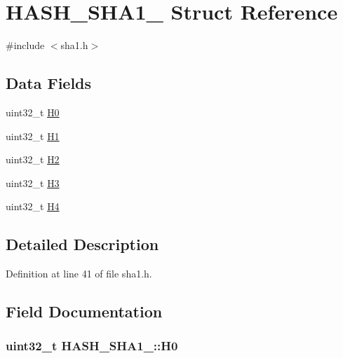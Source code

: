 \hypertarget{structHASH__SHA1__}{\section{H\-A\-S\-H\-\_\-\-S\-H\-A1\-\_\- Struct Reference}
\label{structHASH__SHA1__}
}


{\ttfamily \#include $<$sha1.\-h$>$}

\subsection*{Data Fields}
\begin{DoxyCompactItemize}
\item 
uint32\-\_\-t \hyperlink{structHASH__SHA1___ae1189b75309d542cc08e0eb954fb38af}{H0}
\item 
uint32\-\_\-t \hyperlink{structHASH__SHA1___a2545254302e2eb1e28e94f43cee5ac98}{H1}
\item 
uint32\-\_\-t \hyperlink{structHASH__SHA1___a889fdb5090b3b3d0a823f4f951e32b6c}{H2}
\item 
uint32\-\_\-t \hyperlink{structHASH__SHA1___a453afc35ccc047109080a44ba41d1a66}{H3}
\item 
uint32\-\_\-t \hyperlink{structHASH__SHA1___ab66c6842b1d406e053a31f1370eefb25}{H4}
\end{DoxyCompactItemize}


\subsection{Detailed Description}


Definition at line 41 of file sha1.\-h.



\subsection{Field Documentation}
\hypertarget{structHASH__SHA1___ae1189b75309d542cc08e0eb954fb38af}{
\subsubsection[{H0}]{\setlength{\rightskip}{0pt plus 5cm}uint32\-\_\-t H\-A\-S\-H\-\_\-\-S\-H\-A1\-\_\-\-::\-H0}}\label{structHASH__SHA1___ae1189b75309d542cc08e0eb954fb38af}


